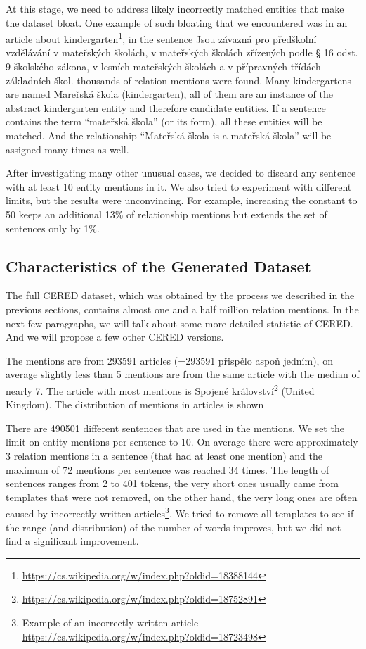 At this stage, we need to address likely incorrectly matched entities that make the dataset bloat. One example of such bloating that we encountered was in an article about kindergarten\footnote{\url{https://cs.wikipedia.org/w/index.php?oldid=18388144}}, in the sentence Jsou závazná pro předškolní vzdělávání v mateřských školách, v mateřských školách zřízených podle § 16 odst. 9 školského zákona, v lesních mateřských školách a v přípravných třídách základních škol. thousands of relation mentions were found. Many kindergartens are named Mareřská škola (kindergarten), all of them are an instance of the abstract kindergarten entity and therefore candidate entities. If a sentence contains the term “mateřská škola” (or its form), all these entities will be matched. And the relationship “Mateřská škola is a mateřská škola” will be assigned many times as well. 

After investigating many other unusual cases, we decided to discard any sentence with at least 10 entity mentions in it. We also tried to experiment with different limits, but the results were unconvincing. For example, increasing the constant to 50 keeps an additional 13\% of relationship mentions but extends the set of sentences only by 1\%.

\subsection{Characteristics of the Generated Dataset}
The full CERED dataset, which was obtained by the process we described in the previous sections, contains almost one and a half million relation mentions. In the next few paragraphs, we will talk about some more detailed statistic of CERED. And we will propose a few other CERED versions.

The mentions are from 293591 articles (=293591 přispělo aspoň jedním), on average slightly less than 5 mentions are from the same article with the median of nearly 7. The article with most mentions is Spojené království\footnote{\url{https://cs.wikipedia.org/w/index.php?oldid=18752891}} (United Kingdom). The distribution of mentions in articles is shown

There are 490501 different sentences that are used in the mentions. We set the limit on entity mentions per sentence to 10. On average there were approximately 3 relation mentions in a sentence (that had at least one mention) and the maximum of 72 mentions per sentence was reached 34 times. The length of sentences ranges from 2 to 401 tokens, the very short ones usually came from templates that were not removed, on the other hand, the very long ones are often caused by incorrectly written articles\footnote{Example of an incorrectly written article \url{https://cs.wikipedia.org/w/index.php?oldid=18723498}}. We tried to remove all templates to see if the range (and distribution) of the number of words improves, but we did not find a significant improvement.




